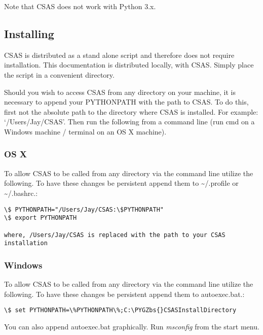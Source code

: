 \documentclass[letterpaper,10pt,english]{sphinxmanual}
\def\PYGZbs{\char`\\}
\begin{document}
Note that CSAS does not work with Python 3.x.


\subsection{Installing}
\label{Installation:installing}
CSAS is distributed as a stand alone script and therefore does not require installation.  This documentation is distributed locally, with CSAS.  Simply place the script in a convenient directory.

Should you wish to access CSAS from any directory on your machine, it is necessary to append your PYTHONPATH with the path to CSAS.  To do this, first not the absolute path to the directory where CSAS is installed.  For example: `/Users/Jay/CSAS'.  Then run the following from a command line (run cmd on a Windows machine / terminal on an OS X machine).


\subsubsection{OS X}
\label{Installation:os-x}
To allow CSAS to be called from any directory via the command line utilize the following.  To have these changes be persistent append them to \textasciitilde{}/.profile or \textasciitilde{}/.bashrc.:

\begin{Verbatim}[commandchars=\\\{\}]
\$ PYTHONPATH="/Users/Jay/CSAS:\$PYTHONPATH"
\$ export PYTHONPATH

where, /Users/Jay/CSAS is replaced with the path to your CSAS installation
\end{Verbatim}


\subsubsection{Windows}
\label{Installation:windows}
To allow CSAS to be called from any directory via the command line utilize the following.  To have these changes be persistent append them to autoexec.bat.:

\begin{Verbatim}[commandchars=\\\{\}]
\$ set PYTHONPATH=\%PYTHONPATH\%;C:\PYGZbs{}CSASInstallDirectory
\end{Verbatim}

You can also append autoexec.bat graphically.  Run \emph{msconfig} from the start menu.
\end{document}
